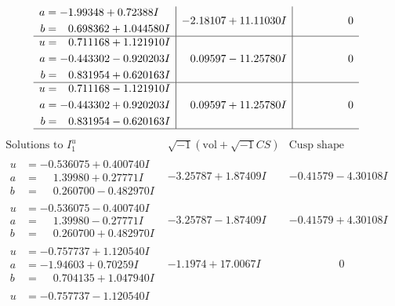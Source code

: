 \documentclass[1p]{elsarticle_modified}
\theoremstyle{definition}
\newcommand{\I}{\sqrt{-1}}
\begin{document}
$$\begin{array}{c|c|c}
\begin{aligned}
a &= -1.99348 + 0.72388 I \\
b &= \phantom{-}0.698362 + 1.044580 I\end{aligned}
 & -2.18107 + 11.11030 I & \phantom{-0.000000 } 0 \\ \hline\begin{aligned}
u &= \phantom{-}0.711168 + 1.121910 I \\
a &= -0.443302 - 0.920203 I \\
b &= \phantom{-}0.831954 + 0.620163 I\end{aligned}
 & \phantom{-}0.09597 - 11.25780 I & \phantom{-0.000000 } 0 \\ \hline\begin{aligned}
u &= \phantom{-}0.711168 - 1.121910 I \\
a &= -0.443302 + 0.920203 I \\
b &= \phantom{-}0.831954 - 0.620163 I\end{aligned}
 & \phantom{-}0.09597 + 11.25780 I & \phantom{-0.000000 } 0\\
 \hline 
 \end{array}$$\newpage$$\begin{array}{c|c|c}  
\text{Solutions to }I^u_{1}& \I (\text{vol} + \sqrt{-1}CS) & \text{Cusp shape}\\
 \hline 
\begin{aligned}
u &= -0.536075 + 0.400740 I \\
a &= \phantom{-}1.39980 + 0.27771 I \\
b &= \phantom{-}0.260700 - 0.482970 I\end{aligned}
 & -3.25787 + 1.87409 I & -0.41579 - 4.30108 I \\ \hline\begin{aligned}
u &= -0.536075 - 0.400740 I \\
a &= \phantom{-}1.39980 - 0.27771 I \\
b &= \phantom{-}0.260700 + 0.482970 I\end{aligned}
 & -3.25787 - 1.87409 I & -0.41579 + 4.30108 I \\ \hline\begin{aligned}
u &= -0.757737 + 1.120540 I \\
a &= -1.94603 + 0.70259 I \\
b &= \phantom{-}0.704135 + 1.047940 I\end{aligned}
 & -1.1974 + 17.0067 I & \phantom{-0.000000 } 0 \\ \hline\begin{aligned}
u &= -0.757737 - 1.120540 I \\

\end{aligned}
\end{array}$$
\end{document}
